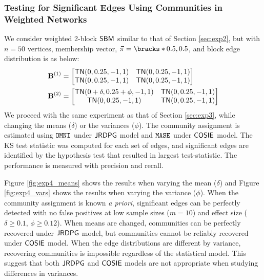 \subsubsection{Testing for Significant Edges Using Communities in Weighted Networks} \label{sec:exp4}
We consider weighted 2-block $\operatorname{\mathsf{SBM}}$ similar to that of Section \ref{sec:exp2}, but with $n=50$ vertices, membership vector, $\vec{\pi} = \bracks*{0.5, 0.5}$, and block edge distribution is as below: 
\begin{align*}
    \operatorname{\mathbf{B}}^{(1)} &= 
    \begin{bmatrix}
        \operatorname{\mathsf{TN}}(0, 0.25, -1, 1)   & \operatorname{\mathsf{TN}}(0, 0.25, -1, 1) \\
        \operatorname{\mathsf{TN}}(0, 0.25, -1, 1)   & \operatorname{\mathsf{TN}}(0, 0.25, -1, 1) 
    \end{bmatrix} \\
    \operatorname{\mathbf{B}}^{(2)} &= 
    \begin{bmatrix}
        \operatorname{\mathsf{TN}}(0 + \delta, 0.25 + \phi, -1, 1)   & \operatorname{\mathsf{TN}}(0, 0.25, -1, 1) \\
        \operatorname{\mathsf{TN}}(0, 0.25, -1, 1)   & \operatorname{\mathsf{TN}}(0, 0.25, -1, 1) 
    \end{bmatrix}
\end{align*}
We proceed with the same experiment as that of Section \ref{sec:exp3}, while changing the means ($\delta$) or the variances ($\phi$). The community assignment is estimated using $\operatorname{\mathtt{OMNI}}$ under $\operatorname{\mathsf{JRDPG}}$ model and $\operatorname{\mathtt{MASE}}$ under $\operatorname{\mathsf{COSIE}}$ model.
The KS test statistic was computed for each set of edges, and significant edges are identified by the hypothesis test that resulted in largest test-statistic.
The performance is measured with precision and recall. 

Figure \ref{fig:exp4_means} shows the results when varying the mean ($\delta$) and Figure \ref{fig:exp4_vars} shows the results when varying the variance ($\phi$). When the community assignment is known \textit{a priori}, significant edges can be perfectly detected with no false positives at low sample sizes ($m=10$) and effect size ($\delta \geq 0.1$, $\phi \geq 0.12$). When means are changed, communities can be perfectly recovered under $\operatorname{\mathsf{JRDPG}}$ model, but communities cannot be reliably recovered under $\operatorname{\mathsf{COSIE}}$ model. When the edge distributions are different by variance, recovering communities is impossible regardless of the statistical model. This suggest that both $\operatorname{\mathsf{JRDPG}}$ and $\operatorname{\mathsf{COSIE}}$ models are not appropriate when studying differences in variances. 

